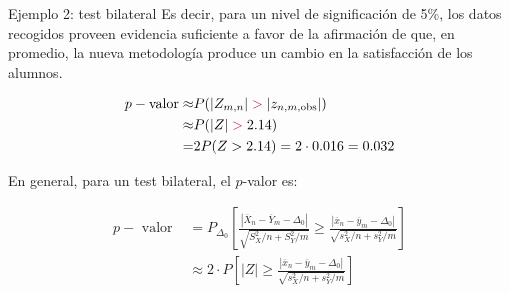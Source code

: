 \documentclass{beamer}
\theoremstyle{definition}
\begin{document}
\begin{frame}{\color{rosee}Ejemplo 2: test bilateral}
\small
Es decir, para un nivel de significaci\'on de 5\%, los datos recogidos proveen evidencia suficiente a favor de la afirmaci\'on de que, en promedio, la nueva metodolog\'ia produce un cambio en la satisfacción de los alumnos.
   
 
   \begin{align*}
   p-\text{valor} \approx &  P(\vert Z_{m,n}\vert \color{rosee}>\color{black}\vert z_{n,m,\text{obs}} \vert ) \\ \approx & P(\vert Z \vert \color{rosee}>\color{black}2.14) \\=& 2 P(Z>2.14)=2\cdot 0.016=0.032
   \end{align*}

   En general, para un test bilateral, el $p$-valor es:
   
   \begin{align*} p-\text { valor } &=P_{\Delta_0}\left[\frac{\left|\overline{X}_{n}-\overline{Y}_{m}-\Delta_0\right|}{\sqrt{S_X^2 / n+S_Y^2 / m}} \geq \frac{\left|\overline{x}_{n}-\overline{y}_{m}-\Delta_0\right|}{\sqrt{s_X^2 / n+s_Y^2 / m}}\right] \\ & \approx 2 \cdot P\left[\vert Z \vert \geq \frac{\left|\overline{x}_{n}-\overline{y}_{m}-\Delta_0\right|}{\sqrt{s_X^2 / n+s_Y^2 / m}}\right] \end{align*}
\end{frame}
\end{document}
